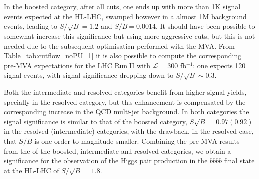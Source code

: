       
    

\begin{table}[t]
  \centering
  \scriptsize
  
  $\,$ \\
  \vspace{0.5cm}
  
  $\,$ \\
  \vspace{0.5cm}
    
    \caption{\small The cross-sections, in femtobarns,
      for the signal and the various background
      processes at different steps of the
      cut-flow, for the resolved (upper table),
      intermediate (middle table) and boosted
      (lower table) categories, for the analysis
      without PU.
      In each case, we also provide the signal over
      background ratio, $S/B$, and the signal
      significance, $S/\sqrt{B}$, considering either
      the total background or only the $4b$ component.
      The different levels of the cut-flow are summarized
      in Table~\ref{tab:cutflowdetails}.
 \label{tab:cutflow_noPU_1}}
\end{table}



%
In the boosted category, after all cuts,
one ends
up with more than 1K signal events expected
at the HL-LHC, swamped  however in a almost 1M background events,
leading to $S/\sqrt{B}=1.2$ and $S/B=0.0014$.
%
It should have been possible to somewhat increase this significance
but using more aggressive cuts,
but this is not needed due to the subsequent
optimisation  performed with the MVA.
%
From  Table~\ref{tab:cutflow_noPU_1}
it is also possible to compute the corresponding pre-MVA
expectations for the LHC Run II with
$\mathcal{L}=300$ fb$^{-1}$: one expects
120 signal events, with signal significance dropping down to
$S/\sqrt{B}\sim 0.3$.
%

Both the intermediate and resolved categories benefit from higher signal yields,
specially in the resolved category, but this enhancement is compensated by the
corresponding
increase in the QCD multi-jet background.
%
In both categories
the signal significance is similar to that of the boosted category,
$S\sqrt{B}=0.97(0.92)$ in the resolved
(intermediate) categories,
with the drawback, in the resolved case,
that $S/B$
is one order to magnitude smaller.
%
Combining the pre-MVA results
from the
of the boosted, intermediate and resolved categories,
we obtain a significance for the observation of the Higgs pair production
in the $b\bar{b}b\bar{b}$ final
state at the HL-LHC of  $S/\sqrt{B}=1.8$.

